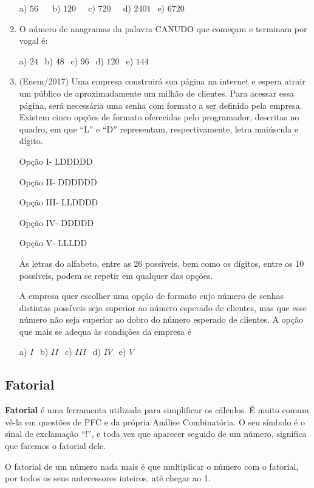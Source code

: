 \begin{multicols*}{2}
\begin{enumerate}
              a) $56 \ \ \ \ \ \ $ b) $120 \ \ \ \ \ $ c) $720 \ \ \ \ \ $ d) $2401 \ \ $ e) $6720 $

        \item O número de anagramas da palavra CANUDO que começam e terminam por vogal é:

              a) $24 \ \ $ b) $48 \ \ $ c) $96 \ \ $ d) $120 \ \ $ e) $144 \ \ $

        \item (Enem/2017) Uma empresa construirá sua página na internet e espera atrair um público de aproximadamente um milhão de clientes. Para acessar essa página, será necessária uma senha com formato a ser definido pela empresa. Existem cinco opções de formato oferecidas pelo programador, descritas no quadro, em que “L” e “D” representam, respectivamente, letra maiúscula e dígito.

              Opção I- LDDDDD

              Opção II- DDDDDD

              Opção III- LLDDDD

              Opção IV- DDDDD

              Opção V- LLLDD

              As letras do alfabeto, entre as 26 possíveis, bem como os dígitos, entre os 10 possíveis, podem se repetir em qualquer das opções.

              A empresa quer escolher uma opção de formato cujo número de senhas distintas possíveis seja superior ao número esperado de clientes, mas que esse número não seja superior ao dobro do número esperado de clientes.
              A opção que mais se adequa às condições da empresa é

              a) $ I \ \ $ b) $II \ \ $ c) $III \ \ $ d) $IV \ \ $ e) $V \ \ $

    \end{enumerate}

    \subsection{Fatorial}

    \textbf{Fatorial} é uma ferramenta utilizada para simplificar os cálculos. É muito comum vê-la em questões de PFC e da própria Análise Combinatória. O seu símbolo é o sinal de exclamação “!”, e toda vez que aparecer seguido de um número, significa que faremos o fatorial dele.

    O fatorial de um número nada mais é que multiplicar o número com o fatorial, por todos os seus antecessores inteiros, até chegar ao 1.


\end{multicols*}
